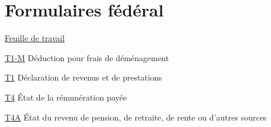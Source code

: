 \chapter*{Formulaires fédéral \cat}

\href{https://www.canada.ca/fr/agence-revenu/services/formulaires-publications/trousses-impot-toutes-annees-imposition/trousse-generale-impot-prestations/5000-d1.html}{Feuille de travail}

\href{https://www.canada.ca/fr/agence-revenu/services/formulaires-publications/formulaires/t1-m.html}{T1-M}
Déduction pour frais de déménagement

\href{https://www.canada.ca/fr/agence-revenu/services/formulaires-publications/trousses-impot-toutes-annees-imposition/trousse-generale-impot-prestations/quebec/5005-r.html}{T1}
Déclaration de revenus et de prestations

\href{https://www.canada.ca/fr/agence-revenu/services/formulaires-publications/formulaires/t4.html}{T4}
État de la rémunération payée

\href{https://www.canada.ca/fr/agence-revenu/services/formulaires-publications/formulaires/t4a.html}{T4A}
État du revenu de pension, de retraite, de rente ou d'autres sources
